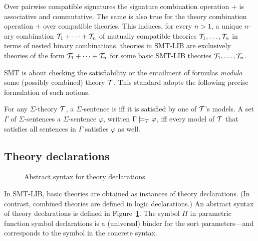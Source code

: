 Over pairwise compatible signatures
the signature combination operation $+$ is associative and commutative.
The same is also true for the theory combination operation $+$ over
compatible theories.
This induces, for every $n > 1$,
a unique $n$-ary combination $\mathcal{T}_1 + \cdots + \mathcal{T}_n$ 
of mutually compatible theories $\mathcal{T}_1,\ldots,\mathcal{T}_n$
in terms of nested binary combinations.
 theories in SMT-LIB are exclusively
theories of the form $\mathcal{T}_1 + \cdots + \mathcal{T}_n$ 
for some basic SMT-LIB theories $\mathcal{T}_1,\ldots,\mathcal{T}_n$.

SMT is about checking the satisfiability or the entailment 
of formulas \emph{modulo} some (possibly combined) theory $\mathcal{T}$.
This standard adopts the following precise formulation of such notions.

\begin{definition}
For any $\Sigma$-theory $\mathcal{T}$,
a $\Sigma$-sentence is 
iff it is satisfied by one of $\mathcal{T}$'s models.
A set $\Gamma$ of $\Sigma$-sentences
 a $\Sigma$-sentence $\varphi$,
written $\Gamma \models_{\mathcal{T}} \varphi$,
iff every model of $\mathcal{T}$ that satisfies all sentences in $\Gamma$
satisfies $\varphi$ as well.
\end{definition}


\subsection{Theory declarations} \label{sec:theory-decl}

\begin{figure}[t]
\theories
\caption{Abstract syntax for theory declarations}
\label{fig:theory-declaration}
\end{figure}

In SMT-LIB, basic theories are obtained as instances of theory declarations.
(In contrast, combined theories are defined in logic declarations.)
An abstract syntax of theory declarations is defined in 
Figure~\ref{fig:theory-declaration}.
The symbol $\Pi$ in parametric function symbol declarations 
is a (universal) binder for the sort parameters---and corresponds 
to the symbol  in the concrete syntax.

